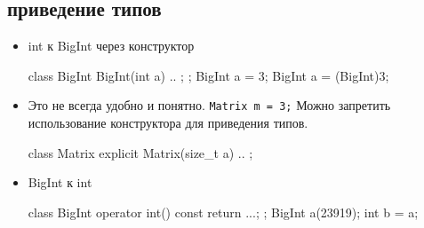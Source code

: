 \subsection{приведение типов}
\begin{itemize}[noitemsep]
    \item int к BigInt через конструктор
\begin{cppcode}
class BigInt {
    BigInt(int a) { .. };
};
BigInt a = 3;
BigInt a = (BigInt)3;
\end{cppcode}
\item Это не всегда удобно и понятно. {\tt Matrix m = 3;} Можно запретить использование конструктора для приведения типов.
\begin{cppcode}
class Matrix {
    explicit Matrix(size_t a) { .. }
};
\end{cppcode}
\item BigInt к int
\begin{cppcode}
class BigInt {
    operator int() const {
	return ...;
    }
};
BigInt a(23919); int b = a;
\end{cppcode}
\end{itemize}
